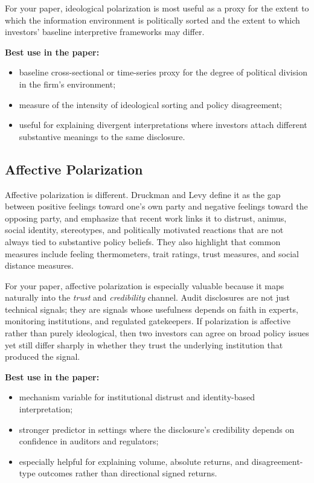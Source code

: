 \documentclass[12pt]{article}
\begin{document}
For your paper, ideological polarization is most useful as a proxy for the extent to which the information environment is politically sorted and the extent to which investors' baseline interpretive frameworks may differ.

\textbf{Best use in the paper:}
\begin{itemize}
    \item baseline cross-sectional or time-series proxy for the degree of political division in the firm's environment;
    \item measure of the intensity of ideological sorting and policy disagreement;
    \item useful for explaining divergent interpretations where investors attach different substantive meanings to the same disclosure.
\end{itemize}

\subsection{Affective Polarization}

Affective polarization is different. Druckman and Levy define it as the gap between positive feelings toward one's own party and negative feelings toward the opposing party, and emphasize that recent work links it to distrust, animus, social identity, stereotypes, and politically motivated reactions that are not always tied to substantive policy beliefs. They also highlight that common measures include feeling thermometers, trait ratings, trust measures, and social distance measures. \cite{druckmanlevy2021}

For your paper, affective polarization is especially valuable because it maps naturally into the \emph{trust} and \emph{credibility} channel. Audit disclosures are not just technical signals; they are signals whose usefulness depends on faith in experts, monitoring institutions, and regulated gatekeepers. If polarization is affective rather than purely ideological, then two investors can agree on broad policy issues yet still differ sharply in whether they trust the underlying institution that produced the signal.

\textbf{Best use in the paper:}
\begin{itemize}
    \item mechanism variable for institutional distrust and identity-based interpretation;
    \item stronger predictor in settings where the disclosure's credibility depends on confidence in auditors and regulators;
    \item especially helpful for explaining volume, absolute returns, and disagreement-type outcomes rather than directional signed returns.
\end{itemize}
\end{document}
